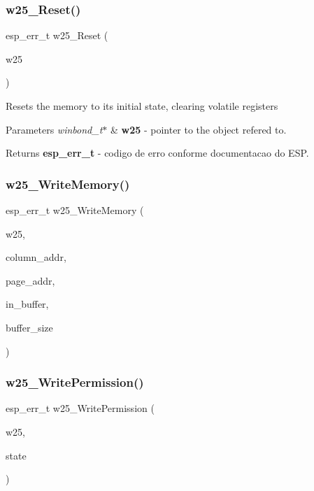 \subsubsection{w25\+\_\+\+Reset()}
{\footnotesize\ttfamily esp\+\_\+err\+\_\+t w25\+\_\+\+Reset (\begin{DoxyParamCaption}\item[{const \textbf{ winbond\+\_\+t} $\ast$}]{w25 }\end{DoxyParamCaption})}

Resets the memory to its initial state, clearing volatile registers 
\begin{DoxyParams}{Parameters}
{\em winbond\+\_\+t$\ast$} & {\bfseries w25} -\/ pointer to the object refered to. \\
\hline
\end{DoxyParams}
\begin{DoxyReturn}{Returns}
{\bfseries esp\+\_\+err\+\_\+t} -\/ codigo de erro conforme documentacao do E\+SP. 
\end{DoxyReturn}
\mbox{\label{_w25_n01_g_v_8h_a290abd3b2d5aabe87ceb0cc101f0fcf9}} 
\subsubsection{w25\+\_\+\+Write\+Memory()}
{\footnotesize\ttfamily esp\+\_\+err\+\_\+t w25\+\_\+\+Write\+Memory (\begin{DoxyParamCaption}\item[{const \textbf{ winbond\+\_\+t} $\ast$}]{w25,  }\item[{uint16\+\_\+t}]{column\+\_\+addr,  }\item[{uint16\+\_\+t}]{page\+\_\+addr,  }\item[{const uint8\+\_\+t $\ast$}]{in\+\_\+buffer,  }\item[{size\+\_\+t}]{buffer\+\_\+size }\end{DoxyParamCaption})}

\mbox{\label{_w25_n01_g_v_8h_ad960b1f5fdf503e9d39f5acd300e9a17}} 
\subsubsection{w25\+\_\+\+Write\+Permission()}
{\footnotesize\ttfamily esp\+\_\+err\+\_\+t w25\+\_\+\+Write\+Permission (\begin{DoxyParamCaption}\item[{const \textbf{ winbond\+\_\+t} $\ast$}]{w25,  }\item[{bool}]{state }\end{DoxyParamCaption})}

